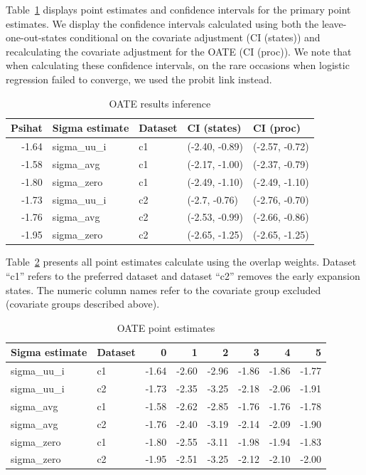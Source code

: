 \documentclass[12pt]{article}
\begin{document}
Table~\ref{tab:oateconfint} displays point estimates and confidence intervals for the primary point estimates. We display the confidence intervals calculated using both the leave-one-out-states conditional on the covariate adjustment (CI (states)) and recalculating the covariate adjustment for the OATE (CI (proc)). We note that when calculating these confidence intervals, on the rare occasions when logistic regression failed to converge, we used the probit link instead.

\begin{table}[ht]
\centering
\begin{tabular}{rllll}
  \toprule
Psihat & Sigma estimate & Dataset & CI (states) & CI (proc) \\ 
  \midrule
-1.64 & sigma\_uu\_i & c1 & (-2.40, -0.89) & (-2.57, -0.72) \\ 
  -1.58 & sigma\_avg & c1 & (-2.17, -1.00) & (-2.37, -0.79) \\ 
  -1.80 & sigma\_zero & c1 & (-2.49, -1.10) & (-2.49, -1.10) \\ 
  -1.73 & sigma\_uu\_i & c2 & (-2.7, -0.76) & (-2.76, -0.70) \\ 
  -1.76 & sigma\_avg & c2 & (-2.53, -0.99) & (-2.66, -0.86) \\ 
  -1.95 & sigma\_zero & c2 & (-2.65, -1.25) & (-2.65, -1.25) \\ 
   \bottomrule
\end{tabular}
\caption{OATE results inference}
\label{tab:oateconfint}
\end{table}

Table~\ref{tab:oatesensitive} presents all point estimates calculate using the overlap weights. Dataset ``c1'' refers to the preferred dataset and dataset ``c2'' removes the early expansion states. The numeric column names refer to the covariate group excluded (covariate groups described above).

\begin{table}[ht]
\centering
\begin{tabular}{llrrrrrr}
  \toprule
Sigma estimate & Dataset & 0 & 1 & 2 & 3 & 4 & 5 \\ 
  \midrule
sigma\_uu\_i & c1 & -1.64 & -2.60 & -2.96 & -1.86 & -1.86 & -1.77 \\ 
  sigma\_uu\_i & c2 & -1.73 & -2.35 & -3.25 & -2.18 & -2.06 & -1.91 \\ 
  sigma\_avg & c1 & -1.58 & -2.62 & -2.85 & -1.76 & -1.76 & -1.78 \\ 
  sigma\_avg & c2 & -1.76 & -2.40 & -3.19 & -2.14 & -2.09 & -1.90 \\ 
  sigma\_zero & c1 & -1.80 & -2.55 & -3.11 & -1.98 & -1.94 & -1.83 \\ 
  sigma\_zero & c2 & -1.95 & -2.51 & -3.25 & -2.12 & -2.10 & -2.00 \\ 
   \bottomrule
\end{tabular}
\caption{OATE point estimates}
\label{tab:oatesensitive}
\end{table}
\end{document}
